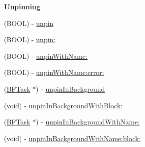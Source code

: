 \begin{Indent}{\bf Unpinning}\par
{\em 

 

 }\begin{DoxyCompactItemize}
\item 
(B\+O\+O\+L) -\/ \hyperlink{interface_p_f_object_adc7c8ee4cf7b3a3d159f953fd900aff7}{unpin}
\item 
(B\+O\+O\+L) -\/ \hyperlink{interface_p_f_object_aa55b03b3c308055daeb244f6c524de55}{unpin\+:}
\item 
(B\+O\+O\+L) -\/ \hyperlink{interface_p_f_object_a2ffe1f92b9ed03b56ba15f0791b16f69}{unpin\+With\+Name\+:}
\item 
(B\+O\+O\+L) -\/ \hyperlink{interface_p_f_object_a937a9ad0989ad1d32b1b3ac0f0c7a2ca}{unpin\+With\+Name\+:error\+:}
\item 
(\hyperlink{interface_b_f_task}{B\+F\+Task} $\ast$) -\/ \hyperlink{interface_p_f_object_a82d006a5567d4119c7182fad27c348a6}{unpin\+In\+Background}
\item 
(void) -\/ \hyperlink{interface_p_f_object_a1b4bb00cbf5d2841f32deeb097beda96}{unpin\+In\+Background\+With\+Block\+:}
\item 
(\hyperlink{interface_b_f_task}{B\+F\+Task} $\ast$) -\/ \hyperlink{interface_p_f_object_a56ddcda6b43920aaf4c4d4da4a024666}{unpin\+In\+Background\+With\+Name\+:}
\item 
(void) -\/ \hyperlink{interface_p_f_object_a645947dac58fe9604e3e939335d1a1d1}{unpin\+In\+Background\+With\+Name\+:block\+:}
\end{DoxyCompactItemize}
\end{Indent}
